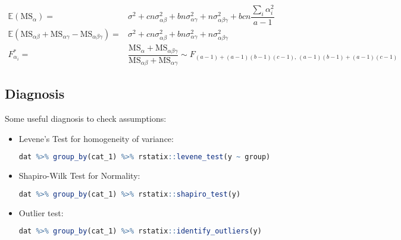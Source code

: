 \begin{enumerate}[topsep=2pt,itemsep=2pt]
    \begin{align}
        \mathbb{E}\left( \mathrm{MS}_\alpha   \right)=&\sigma ^2+cn\sigma ^2_{\alpha \beta }+bn\sigma ^2_{\alpha \gamma}+n\sigma ^2_{\alpha \beta \gamma }+bcn\dfrac{\sum_{i}\alpha _i^2}{a-1} \\
        \mathbb{E}\left( \mathrm{MS}_{\alpha \beta }+\mathrm{MS}_{\alpha \gamma }-\mathrm{MS}_{\alpha \beta \gamma }    \right)=& \sigma ^2+cn\sigma ^2_{\alpha \beta }+bn\sigma ^2_{\alpha \gamma}+n\sigma ^2_{\alpha \beta \gamma }\\
        F^*_{\alpha _i}=&\dfrac{\mathrm{MS}_\alpha+\mathrm{MS}_{\alpha \beta \gamma }}{\mathrm{MS}_{\alpha \beta }+\mathrm{MS}_{\alpha \gamma }}\sim F_{(a-1)+(a-1)(b-1)(c-1),\,(a-1)(b-1)+(a-1)(c-1)} 
    \end{align}

    
    
\end{enumerate}

    





\subsection{Diagnosis}\label{SubSubSectionDiagnosticsToFactorModel}

Some useful diagnosis to check assumptions:
\begin{itemize}[topsep=2pt,itemsep=0pt]
    \item Levene's Test for homogeneity of variance: 
    \begin{rcode}
    \begin{lstlisting}[language=R]
dat %>% group_by(cat_1) %>% rstatix::levene_test(y ~ group)
    \end{lstlisting}
    \end{rcode}
    \item Shapiro-Wilk Test for Normality:
    \begin{rcode}
    \begin{lstlisting}[language=R]
dat %>% group_by(cat_1) %>% rstatix::shapiro_test(y)
    \end{lstlisting}
    \end{rcode}
    \item Outlier test:
    \begin{rcode}
    \begin{lstlisting}[language=R]
dat %>% group_by(cat_1) %>% rstatix::identify_outliers(y)
    \end{lstlisting}
    \end{rcode}
\end{itemize}

